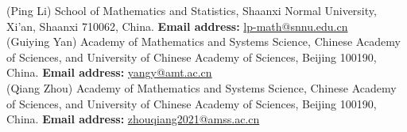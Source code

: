 \documentclass[12pt]{article}
\begin{document}
(Ping Li) School of Mathematics and Statistics, Shaanxi Normal University, Xi'an, Shaanxi 710062, China. 
{\bf Email address:} \href{lp-math@snnu.edu.cn}{lp-math@snnu.edu.cn}\\

(Guiying Yan) Academy of Mathematics and Systems Science, Chinese Academy of Sciences, and University of Chinese Academy of Sciences, Beijing 100190, China.
{\bf Email address:} \href{yangy@amss.ac.cn}{yangy@amt.ac.cn}\\

(Qiang Zhou) Academy of Mathematics and Systems Science, Chinese Academy of Sciences, and University of Chinese Academy of Sciences, Beijing 100190, China. {\bf Email address:} \href{zhouqiang2021@amss.ac.cn}{zhouqiang2021@amss.ac.cn}\\
\end{document}
